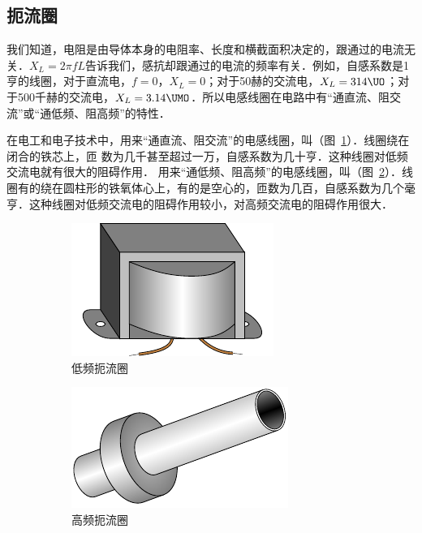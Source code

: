 \subsection{扼流圈}

我们知道，电阻是由导体本身的电阻率、长度和横截面积决定的，跟通过的电流无关．$X_L=2\pi fL$告诉我们，感抗却跟通过的电流的频率有关．例如，自感系数是1亨的线圈，对于直流电，$f=0$，$X_L=0$；对于50赫的交流电，$X_L=314 \UO$；对于500千赫的交流电，$X_L=3.14 \UMO $．所以电感线圈在电路中有“通直流、阻交流”或“通低频、阻高频”的特性．

在电工和电子技术中，用来“通直流、阻交流”的电感线圈，叫（图~\ref{fig_C_3-16a}）．线圈绕在闭合的铁芯上，匝
数为几千甚至超过一万，自感系数为几十亨．这种线圈对低频交流电就有很大的阻碍作用．
用来“通低频、阻高频”的电感线圈，叫（图~\ref{fig_C_3-16b}）．线圈有的绕在圆柱形的铁氧体心上，有的是空心的，匝数为几百，自感系数为几个毫亨．这种线圈对低频交流电的阻碍作用较小，对高频交流电的阻碍作用很大．
\begin{figure}[htbp]
    \centering
    \begin{subfigure}{0.4\linewidth}
        \centering
        \includegraphics{fig/C/3-16a.pdf}
        \caption{低频扼流圈}\label{fig_C_3-16a}
    \end{subfigure}
    \hfil
    \begin{subfigure}{0.4\linewidth}
        \centering
        \includegraphics{fig/C/3-16b.pdf}
        \caption{高频扼流圈}\label{fig_C_3-16b}
    \end{subfigure}
    \caption{}\label{fig_C_3-16}
\end{figure}

